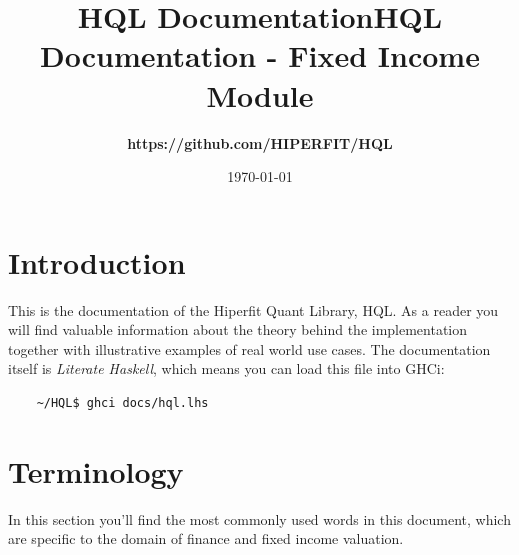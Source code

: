 \documentclass[11pt,a4paper]{article}
\def\Author{
\bf https://github.com/HIPERFIT/HQL
}
\def\Title{\bf HQL Documentation \sf- Fixed Income Module}
\numberwithin{equation}{section}
\begin{document}
\title{HQL Documentation}

\title{\Title}
\author{\Author}
\date{\today}
\maketitle

\tableofcontents

\FrameSep

\newpage


	\section{Introduction}
	This is the documentation of the Hiperfit Quant Library, HQL. As a reader you will
	find valuable information about the theory behind the implementation together with
	illustrative examples of real world use cases. The documentation itself is \textit{Literate Haskell}\cite{LitHaskell},
	which means you can load this file into GHCi:

	\FrameSep
	\begin{lstlisting}
	~/HQL$ ghci docs/hql.lhs
	\end{lstlisting}

	\section{Terminology}
	In this section you'll find the most commonly used words in this document, which are specific to the domain of finance and fixed income valuation.

\end{document}
